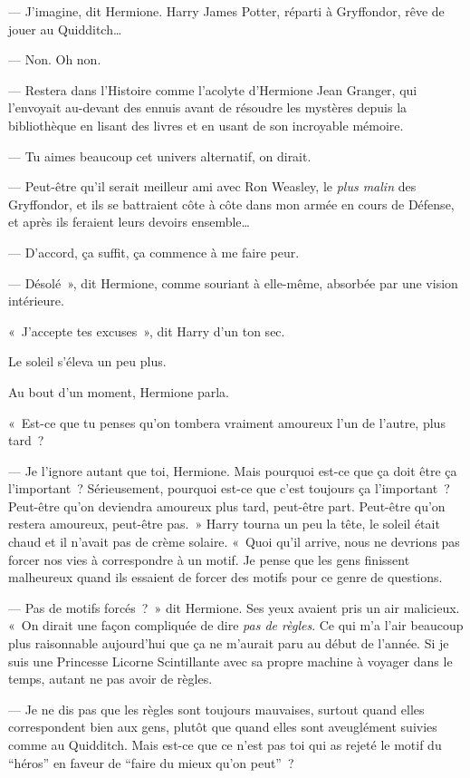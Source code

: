 --- J'imagine, dit Hermione. Harry James Potter, réparti à Gryffondor, rêve de jouer au Quidditch…

--- Non. Oh non.

--- Restera dans l'Histoire comme l'acolyte d'Hermione Jean Granger, qui l'envoyait au-devant des ennuis avant de résoudre les mystères depuis la bibliothèque en lisant des livres et en usant de son incroyable mémoire.

--- Tu aimes beaucoup cet univers alternatif, on dirait.

--- Peut-être qu'il serait meilleur ami avec Ron Weasley, le \emph{plus malin} des Gryffondor, et ils se battraient côte à côte dans mon armée en cours de Défense, et après ils feraient leurs devoirs ensemble…

--- D'accord, ça suffit, ça commence à me faire peur.

--- Désolé~», dit Hermione, comme souriant à elle-même, absorbée par une vision intérieure.

«~J'accepte tes excuses~», dit Harry d'un ton sec.

Le soleil s'éleva un peu plus.

Au bout d'un moment, Hermione parla.

«~Est-ce que tu penses qu'on tombera vraiment amoureux l'un de l'autre, plus tard~?

--- Je l'ignore autant que toi, Hermione. Mais pourquoi est-ce que ça doit être ça l'important~? Sérieusement, pourquoi est-ce que c'est toujours ça l'important~? Peut-être qu'on deviendra amoureux plus tard, peut-être part. Peut-être qu'on restera amoureux, peut-être pas.~» Harry tourna un peu la tête, le soleil était chaud et il n'avait pas de crème solaire. «~Quoi qu'il arrive, nous ne devrions pas forcer nos vies à correspondre à un motif. Je pense que les gens finissent malheureux quand ils essaient de forcer des motifs pour ce genre de questions.

--- Pas de motifs forcés~?~» dit Hermione. Ses yeux avaient pris un air malicieux. «~On dirait une façon compliquée de dire \emph{pas de règles}. Ce qui m'a l'air beaucoup plus raisonnable aujourd'hui que ça ne m'aurait paru au début de l'année. Si je suis une Princesse Licorne Scintillante avec sa propre machine à voyager dans le temps, autant ne pas avoir de règles.

--- Je ne dis pas que les règles sont toujours mauvaises, surtout quand elles correspondent bien aux gens, plutôt que quand elles sont aveuglément suivies comme au Quidditch. Mais est-ce que ce n'est pas toi qui as rejeté le motif du “héros” en faveur de “faire du mieux qu'on peut”~?

